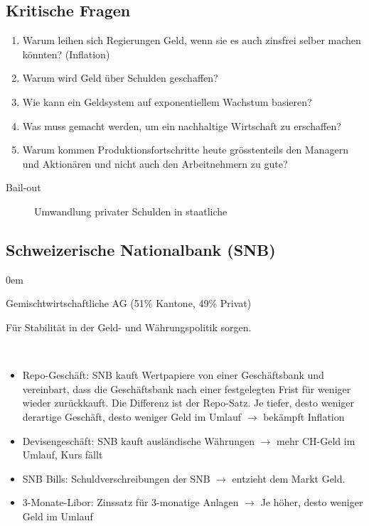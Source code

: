 \subsection{Kritische Fragen}
\begin{enumerate}\itemsep0em
	\item Warum leihen sich Regierungen Geld, wenn sie es auch zinsfrei selber machen könnten? (Inflation)
	\item Warum wird Geld über Schulden geschaffen?
	\item Wie kann ein Geldsystem auf exponentiellem Wachstum basieren?
	\item Was muss gemacht werden, um ein nachhaltige Wirtschaft zu erschaffen?
	\item Warum kommen Produktionsfortschritte heute grösstenteils den Managern und Aktionären und nicht auch den
	Arbeitnehmern zu gute?
\end{enumerate}

\begin{description}
	\item [Bail-out] Umwandlung privater Schulden in staatliche
\end{description}

\subsection{Schweizerische Nationalbank (SNB)}
\begin{description}\itemsep0em
	\item [Rechtsform] Gemischtwirtschaftliche AG (51\% Kantone, 49\% Privat)
	\item [Hauptaufgabe] Für Stabilität in der Geld- und Währungspolitik sorgen.
	\item [Instrumente] ~\\
	\begin{itemize}\itemsep0em
	\item Repo-Geschäft: SNB kauft Wertpapiere von einer Geschäftsbank und vereinbart, dass die Geschäftsbank nach einer festgelegten Frist für weniger wieder zurückkauft. Die Differenz ist der Repo-Satz. 
	Je tiefer, desto weniger derartige Geschäft, desto weniger Geld im Umlauf $\rightarrow$ bekämpft Inflation
	\item Devisengeschäft: SNB kauft ausländische Währungen $\rightarrow$ mehr CH-Geld im Umlauf, Kurs fällt
	\item SNB Bills: Schuldverschreibungen der SNB $\rightarrow$ entzieht dem Markt Geld.
 	\item 3-Monate-Libor: Zinssatz für 3-monatige Anlagen $\rightarrow$ Je höher, desto weniger Geld im Umlauf
	\end{itemize}
\end{description}

